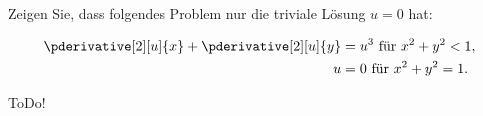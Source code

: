 
\begin{exercise}

Zeigen Sie, dass folgendes Problem nur die triviale Lösung $u = 0$ hat:

\begin{align*}
    \pderivative[2][u]{x} + \pderivative[2][u]{y} & = u^3 ~\text{für}~ x^2 + y^2 < 1, \\
    \quad
    u & = 0 ~\text{für}~ x^2 + y^2 = 1.
\end{align*}

\end{exercise}


\begin{solution}

ToDo!

\end{solution}

